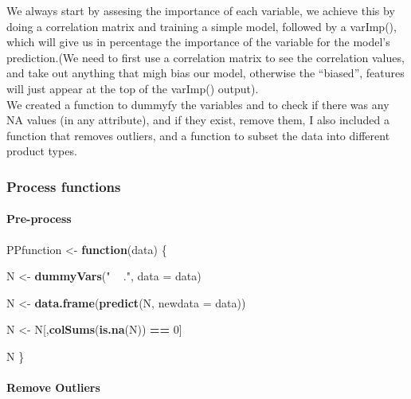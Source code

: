\documentclass[]{article}
\newenvironment{Shaded}{\begin{snugshade}}{\end{snugshade}}
\newcommand{\KeywordTok}[1]{\textcolor[rgb]{0.13,0.29,0.53}{\textbf{#1}}}
\newcommand{\DataTypeTok}[1]{\textcolor[rgb]{0.13,0.29,0.53}{#1}}
\newcommand{\DecValTok}[1]{\textcolor[rgb]{0.00,0.00,0.81}{#1}}
\newcommand{\StringTok}[1]{\textcolor[rgb]{0.31,0.60,0.02}{#1}}
\newcommand{\ControlFlowTok}[1]{\textcolor[rgb]{0.13,0.29,0.53}{\textbf{#1}}}
\newcommand{\OperatorTok}[1]{\textcolor[rgb]{0.81,0.36,0.00}{\textbf{#1}}}
\newcommand{\NormalTok}[1]{#1}
\let\oldparagraph\paragraph
\renewcommand{\paragraph}[1]{\oldparagraph{#1}\mbox{}}
\begin{document}
We always start by assesing the importance of each variable, we achieve
this by doing a correlation matrix and training a simple model, followed
by a varImp(), which will give us in percentage the importance of the
variable for the model's prediction.(We need to first use a correlation
matrix to see the correlation values, and take out anything that migh
bias our model, otherwise the ``biased'', features will just appear at
the top of the varImp() output).\\
 We created a function to dummyfy the variables and to check if there
was any NA values (in any attribute), and if they exist, remove them, I
also included a function that removes outliers, and a function to subset
the data into different product types.

\subsubsection{Process functions}\label{process-functions}

\paragraph{Pre-process}\label{pre-process-1}

\begin{Shaded}
\begin{Highlighting}[]
\NormalTok{PPfunction <-}\StringTok{ }\ControlFlowTok{function}\NormalTok{(data) \{}
  
\NormalTok{  N <-}\StringTok{ }\KeywordTok{dummyVars}\NormalTok{(}\StringTok{" ~ ."}\NormalTok{, }\DataTypeTok{data =}\NormalTok{ data)}
  
\NormalTok{  N <-}\StringTok{ }\KeywordTok{data.frame}\NormalTok{(}\KeywordTok{predict}\NormalTok{(N, }\DataTypeTok{newdata =}\NormalTok{ data))}
  
\NormalTok{  N <-}\StringTok{ }\NormalTok{N[,}\KeywordTok{colSums}\NormalTok{(}\KeywordTok{is.na}\NormalTok{(N)) }\OperatorTok{==}\StringTok{ }\DecValTok{0}\NormalTok{] }
  
\NormalTok{  N }
\NormalTok{\}}
\end{Highlighting}
\end{Shaded}

\paragraph{Remove Outliers}\label{remove-outliers}
\end{document}

